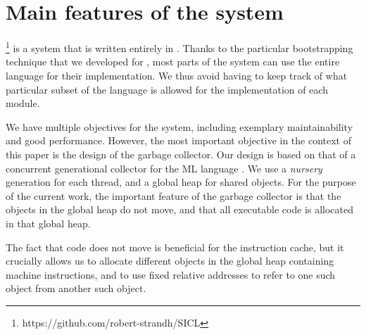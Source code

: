 \section{Main features of the \sicl{} system}
\label{sec-sicl-features}

\sicl{}%
\footnote{https://github.com/robert-strandh/SICL}
is a system that is written entirely in \commonlisp{}.  Thanks
to the particular bootstrapping technique
\cite{durand_irene_2019_2634314} that we developed for \sicl{}, most
parts of the system can use the entire language for their
implementation.  We thus avoid having to keep track of what particular
subset of the language is allowed for the implementation of each
module.

We have multiple objectives for the \sicl{} system, including
exemplary maintainability and good performance.  However, the most
important objective in the context of this paper is the design of the
garbage collector.  Our design is based on that of a concurrent
generational collector for the ML language \cite{Doligez:1993:CGG}.
We use a \emph{nursery} generation for each thread, and a global heap
for shared objects.  For the purpose of the current work, the
important feature of the garbage collector is that the objects in the
global heap do not move, and that all executable code is allocated in
that global heap.

The fact that code does not move is beneficial for the instruction
cache, but it crucially allows us to allocate different objects in the
global heap containing machine instructions, and to use fixed relative
addresses to refer to one such object from another such object.
